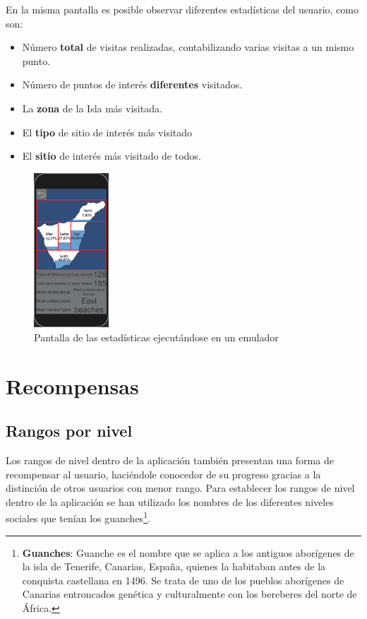 En la misma pantalla es posible observar diferentes estadísticas del usuario, como son:
\begin{itemize}
\item Número \textbf{total} de visitas realizadas, contabilizando varias visitas a un mismo punto.
\item Número de puntos de interés \textbf{diferentes} visitados.
\item La \textbf{zona} de la Isla más visitada.
\item El \textbf{tipo} de sitio de interés más visitado
\item El \textbf{sitio} de interés más visitado de todos.
\end{itemize}

\begin{figure}[H]
    \centering
    \includegraphics[width=0.25\textwidth]{Memoria_TFG_LaTeX/images/pantallaEstadisticas.png}
    \caption{Pantalla de las estadísticas ejecutándose en un emulador}
    \label{fig:pantallaEstadísticas}
\end{figure}

\newpage
\section{Recompensas}
\subsection{Rangos por nivel}
Los rangos de nivel dentro de la aplicación también presentan una forma de recompensar al usuario, haciéndole conocedor de su progreso gracias a la distinción de otros usuarios con menor rango.
Para establecer los rangos de nivel dentro de la aplicación se han utilizado los nombres de los diferentes niveles sociales que tenían los guanches\footnote{\textbf{Guanches}: Guanche es el nombre que se aplica a los antiguos aborígenes de la isla de Tenerife, Canarias, España, quienes la habitaban antes de la conquista castellana en 1496. Se trata de uno de los pueblos aborígenes de Canarias entroncados genética y culturalmente con los bereberes del norte de África.}.


